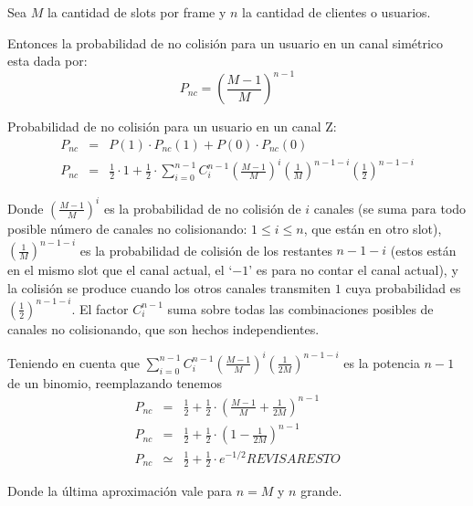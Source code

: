 Sea $M$ la cantidad de slots por frame y $n$ la cantidad de clientes o usuarios.

Entonces la probabilidad de no colisión para un usuario en un canal simétrico esta dada por:
\begin{equation}
P_{nc}=\left(\frac{M-1}{M}\right)^{n-1}
\end{equation}


\noindent Probabilidad de no colisión para un usuario en un canal Z:
\begin{eqnarray}
P_{nc} & = & P(1) \cdot P_{nc}(1) + P(0) \cdot P_{nc}(0) \\
P_{nc} & = & \frac{1}{2} \cdot 1 +  \frac{1}{2} \cdot \sum_{i=0}^{n-1} 
C^{n-1}_{i} \left(\frac{M-1}{M}\right)^i  \left(\frac{1}{M}\right)^{n-1-i}  \left(\frac{1}{2}\right)^{n-1-i} 
\end{eqnarray}

\noindent Donde $\left(\frac{M-1}{M}\right)^i$ es la probabilidad de no colisión de $i$ canales (se suma para todo posible número de canales no
colisionando: $1\leq i\leq n$, que están en otro slot), $
\left(\frac{1}{M}\right)^{n-1-i}$ es la probabilidad de colisión de los restantes
$n-1-i$ (estos están en el mismo slot que el canal actual, el `$-1$' es para no
contar el canal actual), y la colisión se produce cuando los otros canales
transmiten $1$ cuya probabilidad es $\left(\frac{1}{2}\right)^{n-1-i}$. El
factor $C^{n-1}_{i}$ suma sobre todas las combinaciones posibles de canales no
colisionando, que son hechos independientes.

\noindent Teniendo en cuenta que $ \sum_{i=0}^{n-1}
C^{n-1}_{i} \left(\frac{M-1}{M}\right)^i  \left(\frac{1}{2M}\right)^{n-1-i}$ es la potencia $n-1$ de un binomio, reemplazando tenemos
\begin{eqnarray}
P_{nc} & = & \frac{1}{2} +  \frac{1}{2} \cdot \left(\frac{M-1}{M} + \frac{1}{2M} \right)^{n-1} \\
P_{nc} & = & \frac{1}{2} +  \frac{1}{2} \cdot \left(1- \frac{1}{2M} \right)^{n-1} \\
P_{nc} & \simeq & \frac{1}{2} +  \frac{1}{2} \cdot e^{-1/2} REVISAR ESTO
\end{eqnarray}

\noindent Donde la última aproximación vale para $n=M$ y $n$ grande.

\iffalse

\vspace{5mm}

